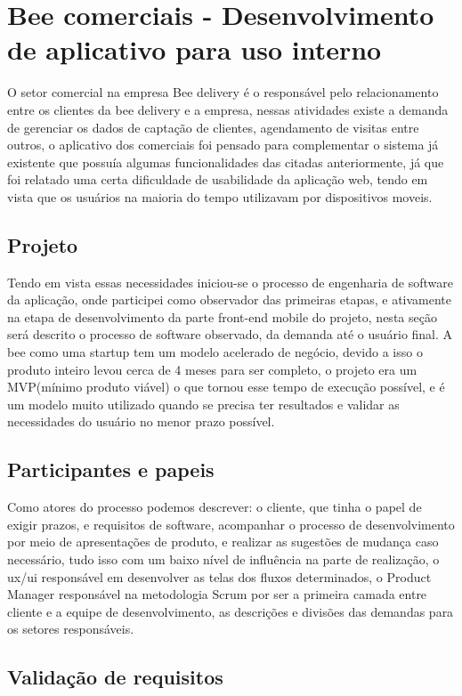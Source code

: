 \documentclass{ufersa}
\begin{document}
\section{ Bee comerciais - Desenvolvimento de aplicativo para uso interno}
O setor comercial na empresa Bee delivery é o responsável pelo relacionamento entre os clientes da bee delivery e a empresa, nessas atividades existe a demanda de gerenciar os dados de captação de clientes, agendamento de visitas entre outros, o aplicativo dos comerciais foi pensado para complementar o sistema já existente que possuía algumas funcionalidades das citadas anteriormente, já que foi relatado uma certa dificuldade de usabilidade da aplicação web, tendo em vista que os usuários na maioria do tempo utilizavam por dispositivos moveis. 

\subsection{Projeto}
Tendo em vista essas necessidades iniciou-se o processo de engenharia de software da aplicação, onde participei como observador das primeiras etapas, e ativamente na etapa de desenvolvimento da parte front-end mobile do projeto, nesta seção será descrito o processo de software observado, da demanda até o usuário final. A bee como uma startup tem um modelo acelerado de negócio, devido a isso o produto inteiro levou cerca de 4 meses para ser completo, o projeto era um MVP(mínimo produto viável) o que tornou esse tempo de execução possível, e é um modelo muito utilizado quando se precisa ter resultados e validar as necessidades do usuário no menor prazo possível.

\subsection{Participantes e papeis}

Como atores do processo podemos descrever: o cliente, que tinha o papel de exigir prazos, e requisitos de software, acompanhar o processo de desenvolvimento por meio de apresentações de produto, e realizar as sugestões de mudança caso necessário, tudo isso com um baixo nível de influência na parte de realização, o ux/ui responsável em desenvolver as telas dos fluxos determinados, o Product Manager responsável na metodologia Scrum por ser a primeira camada entre cliente e a equipe de desenvolvimento, as descrições e divisões das demandas para os setores responsáveis.

\subsection{Validação de requisitos}
\end{document}
